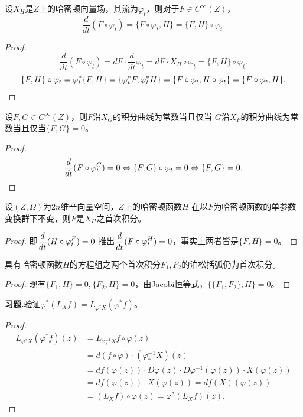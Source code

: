 \begin{corollary}
    设$X_H$是$Z$上的哈密顿向量场，其流为$\varphi_t$，则对于$F\in C^\infty(Z)$，
    $$\frac{d}{dt}(F\circ\varphi_t)
    =\{F\circ\varphi_t,H\}=\{F,H\}\circ\varphi_t.$$
\end{corollary}
\begin{proof}
    $$\frac{d}{dt}(F\circ\varphi_t)=dF\cdot\frac{d}{dt}\varphi_t
    =dF\cdot X_H\circ\varphi_t=\{F,H\}\circ\varphi_t.$$
    $$\{F,H\}\circ\varphi_t=\varphi_t^*\{F,H\}=\{\varphi_t^*F,\varphi_t^*H\}
    =\{F\circ\varphi_t,H\circ\varphi_t\}=\{F\circ\varphi_t,H\}.\qedhere$$
\end{proof}

\begin{corollary}
    设$F,G\in C^\infty(Z)$，则$F$沿$X_G$的积分曲线为常数当且仅当
    $G$沿$X_F$的积分曲线为常数当且仅当$\{F,G\}=0$。
\end{corollary}
\begin{proof}
    $$\frac{d}{dt}(F\circ\varphi_t^G)=0
    \Leftrightarrow\{F,G\}\circ\varphi_t=0\Leftrightarrow\{F,G\}=0.\qedhere$$
\end{proof}

\begin{theorem}
    设$(Z,\Omega)$为$2n$维辛向量空间，$Z$上的哈密顿函数$H$
    在以$F$为哈密顿函数的单参数变换群下不变，则$F$是$X_H$之首次积分。
\end{theorem}
\begin{proof}
    即$\displaystyle \frac{d}{dt}(H\circ\varphi_t^F)=0$
    推出$\displaystyle \frac{d}{dt}(F\circ\varphi_t^H)=0$，事实上两者皆是$\{F,H\}=0$。
\end{proof}

\begin{corollary}[泊松定理]
    具有哈密顿函数$H$的方程组之两个首次积分$F_1,F_2$的泊松括弧仍为首次积分。
\end{corollary}
\begin{proof}
    现有$\{F_1,H\}=0,\{F_2,H\}=0$，由Jacobi恒等式，$\{\{F_1,F_2\},H\}=0$。
\end{proof}

\textbf{习题.}验证$\varphi^*(L_Xf)=L_{\varphi^*X}(\varphi^*f)$。
\begin{proof}
    \begin{align*}
        L_{\varphi^*X}(\varphi^*f)(z)&=L_{\varphi_*^{-1}X}f\circ\varphi(z)\\
        &=d(f\circ\varphi)\cdot(\varphi_*^{-1}X)(z)\\
        &=df(\varphi(z))\cdot D\varphi(z)\cdot D\varphi^{-1}(\varphi(z))\cdot X(\varphi(z))\\
        &=df(\varphi(z))\cdot X(\varphi(z))=df(X)(\varphi(z))\\
        &=(L_Xf)\circ\varphi(z)=\varphi^*(L_Xf)(z).
    \end{align*}
\end{proof}

